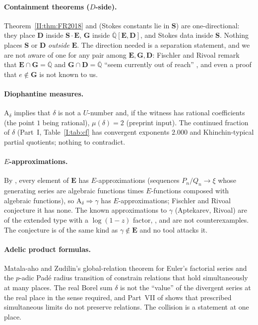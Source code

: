 \documentclass[11pt,a4paper]{article}
\newcommand{\Qbar}{\overline{\mathbb Q}}
\newcommand{\EE}{\mathbf E}
\newcommand{\GG}{\mathbf G}
\newcommand{\DD}{\mathbf D}
\newcommand{\Sring}{\mathbf S}
\theoremstyle{definition}
\theoremstyle{remark}
\numberwithin{equation}{section}
\begin{document}
\paragraph{Containment theorems ($D$-side).}
Theorem~\ref{II:thm:FR2018} and \cite[Thm.~2]{FR2016} (Stokes constants lie in $\Sring$) are
one-directional: they place $\DD$ inside $\Sring\cdot\EE$, $\GG$ inside $\Qbar[\EE,\DD]$, and
Stokes data inside $\Sring$. Nothing places $\Sring$ or $\DD$ \emph{outside} $\EE$. The
direction needed is a separation statement, and we are not aware of one for any pair among
$\EE,\GG,\DD$: Fischler and Rivoal remark that $\EE\cap\GG=\Qbar$ and $\GG\cap\DD=\Qbar$
``seem currently out of reach'' \cite{FRmixed}, and even a proof that $e\notin\GG$ is not
known to us.

\paragraph{Diophantine measures.}
$\mathrm A_\delta$ implies that $\delta$ is not a $U$-number \cite[Cor.~3]{FRliouville} and,
if the witness has rational coefficients (the point $1$ being rational),
$\mu(\delta)=2$ \cite[Thm.~1]{FRexponent} (preprint input). The continued fraction of
$\delta$ (Part~I, Table~\ref{I:tab:cf} has convergent exponents $2.000$ and Khinchin-typical partial
quotients; nothing to contradict.

\paragraph{$E$-approximations.}
By \cite[Thm.~3]{FR2016}, every element of $\EE$ has $E$-approximations (sequences
$P_n/Q_n\to\xi$ whose generating series are algebraic functions times $E$-functions
composed with algebraic functions), so $\mathrm A_\delta\Rightarrow\gamma$ has
$E$-approximations; Fischler and Rivoal conjecture it has none. The known approximations to
$\gamma$ (Aptekarev, Rivoal) are of the extended type with a $\log(1-z)$ factor,
\cite[eq.~(1.8)]{FR2016}, and are not counterexamples. The conjecture is of the same kind
as $\gamma\notin\EE$ and no tool attacks it.

\paragraph{Adelic product formulas.}
Matala-aho and Zudilin's global-relation theorem for Euler's factorial series \cite{MZ} and
the $p$-adic Pad\'e radius transition of \cite{K001} constrain relations that hold
simultaneously at many places. The real Borel sum $\delta$ is not the ``value'' of the
divergent series at the real place in the sense required, and Part~VII of \cite{M} shows
that prescribed simultaneous limits do not preserve relations. The collision is a
statement at one place.
\end{document}

